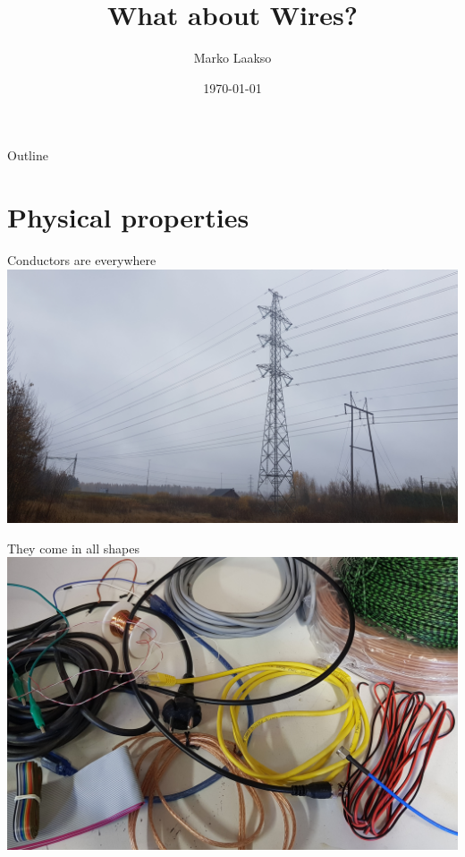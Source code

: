 \documentclass{beamer}
\title{What about Wires?}
\author{Marko Laakso}
\institute{Asser's Lab}
\date{\today}
\begin{document}
\frame{\titlepage}

\begin{frame}{Outline}
    \tableofcontents
\end{frame}

\section{Physical properties}

\begin{frame}{Conductors are everywhere}
\centering\includegraphics[keepaspectratio, width=0.94\paperwidth]{powerline_h.jpg}
\end{frame}

\begin{frame}{They come in all shapes}
\centering\includegraphics[keepaspectratio, width=0.88\paperwidth]{wires.jpg}
\end{frame}

\end{document}
